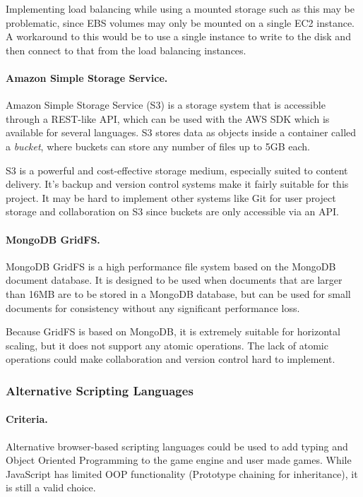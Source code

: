 \documentclass[a4paper, 12pt]{article}
\begin{document}
Implementing load balancing while using a mounted storage such as this may be problematic, since EBS volumes may only be mounted on a single EC2 instance. A workaround to this would be to use a single instance to write to the disk and then connect to that from the load balancing instances.

\paragraph{Amazon Simple Storage Service.}
Amazon Simple Storage Service (S3) is a storage system that is accessible through a REST-like API, which can be used with the AWS SDK which is available for several languages.\cite{awss3} S3 stores data as objects inside a container called a \emph{bucket}, where buckets can store any number of files up to 5GB each.

S3 is a powerful and cost-effective storage medium, especially suited to content delivery. It's backup and version control systems make it fairly suitable for this project.\cite{awss3} It may be hard to implement other systems like Git for user project storage and collaboration on S3 since buckets are only accessible via an API.

\paragraph{MongoDB GridFS.}
MongoDB GridFS is a high performance file system based on the MongoDB document database. It is designed to be used when documents that are larger than 16MB are to be stored in a MongoDB database, but can be used for small documents for consistency without any significant performance loss.\cite{gridfs}

Because GridFS is based on MongoDB, it is extremely suitable for horizontal scaling, but it does not support any atomic operations.\cite{gridfsatomic} The lack of atomic operations could make collaboration and version control hard to implement.

\subsubsection{Alternative Scripting Languages}
\paragraph{Criteria.}
Alternative browser-based scripting languages could be used to add typing and Object Oriented Programming to the game engine and user made games. While JavaScript has limited OOP functionality (Prototype chaining for inheritance), it is still a valid choice.
\end{document}
